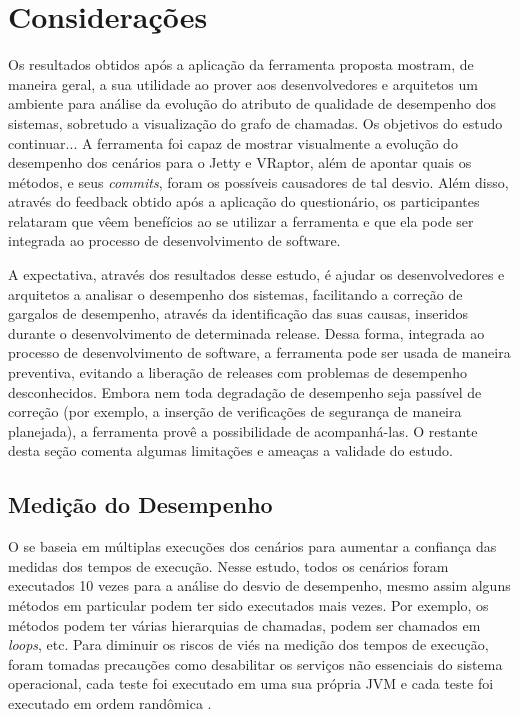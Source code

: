 \section{Considerações} \label{sec:avaliacao-consideracoes}

Os resultados obtidos após a aplicação da ferramenta proposta mostram, de maneira geral, a sua utilidade ao prover aos desenvolvedores e arquitetos um ambiente para análise da evolução do atributo de qualidade de desempenho dos sistemas, sobretudo a visualização do grafo de chamadas. Os objetivos do estudo {\color{red} continuar...}
A ferramenta foi capaz de mostrar visualmente a evolução do desempenho dos cenários para o Jetty e VRaptor, além de apontar quais os métodos, e seus \textit{commits}, foram os possíveis causadores de tal desvio. Além disso, através do feedback obtido após a aplicação do questionário, os participantes relataram que vêem benefícios ao se utilizar a ferramenta e que ela pode ser integrada ao processo de desenvolvimento de software.

A expectativa, através dos resultados desse estudo, é ajudar os desenvolvedores e arquitetos a analisar o desempenho dos sistemas, facilitando a correção de gargalos de desempenho, através da identificação das suas causas, inseridos durante o desenvolvimento de determinada release. Dessa forma, integrada ao processo de desenvolvimento de software, a ferramenta pode ser usada de maneira preventiva, evitando a liberação de releases com problemas de desempenho desconhecidos. Embora nem toda degradação de desempenho seja passível de correção (por exemplo, a inserção de verificações de segurança de maneira planejada), a ferramenta provê a possibilidade de acompanhá-las. O restante desta seção comenta algumas limitações e ameaças a validade do estudo.

\subsection{Medição do Desempenho}

O \textit{\perfMinerName} se baseia em múltiplas execuções dos cenários para aumentar a confiança das medidas dos tempos de execução. Nesse estudo, todos os cenários foram executados 10 vezes para a análise do desvio de desempenho, mesmo assim alguns métodos em particular podem ter sido executados mais vezes. Por exemplo, os métodos podem ter várias hierarquias de chamadas, podem ser chamados em \textit{loops}, etc. Para diminuir os riscos de viés na medição dos tempos de execução, foram tomadas precauções como desabilitar os serviços não essenciais do sistema operacional, cada teste foi executado em uma sua própria JVM e cada teste foi executado em ordem randômica \cite{Pinto2015}.


